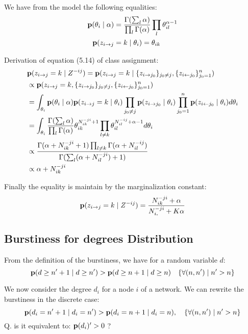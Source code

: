 \documentclass[a4paper, 12pt]{article}
\begin{document}
We have from the model the following equalities:
\begin{align}
\mathbf{p}(\theta_i \mid \alpha) &= \frac{\Gamma(\sum_l \alpha)}{\prod_l \Gamma(\alpha)} \prod_l \theta_{il}^{\alpha-1} \\
\mathbf{p}(z_{i\rightarrow j} &= k \mid \theta_i) = \theta_{ik}
\end{align}

Derivation of equation (5.14) of class assignment:
\begin{align}
&\mathbf{p}(z_{i\rightarrow j}=k \mid Z^{-ij}) = \mathbf{p}(z_{i\rightarrow j}=k \mid \{z_{i\rightarrow j_0}\}_{j_0\neq j},\{z_{i\leftarrow j_0}\}_{j_0= 1}^n )\\
&\propto \mathbf{p}(z_{i\rightarrow j}= k,\{z_{i\rightarrow j_0}\}_{j_0\neq j},\{z_{i\leftarrow j_0}\}_{j_0= 1}^n ) \\
&= \int_{\theta_i} \mathbf{p}(\theta_i \mid \alpha) \mathbf{p}(z_{i\rightarrow j}=k \mid \theta_i) \prod_{j_0\neq j} \mathbf{p}(z_{i\rightarrow j_0} \mid \theta_i) \prod_{j_0 =  1}^n  \mathbf{p}(z_{i\leftarrow j_0} \mid \theta_i)  d\theta_i \\
&=\int_{\theta_i} \frac{\Gamma(\sum_l \alpha)}{\prod_l \Gamma(\alpha)}\theta_{ik}^{N_{ik}^{-ji}+1} \prod_{l\neq k} \theta_{il}^{N_{il}^{-ij} +\alpha-1} d\theta_i \\
&\propto \frac{\Gamma(\alpha + N_{ik}^{-ji}+1)\prod_{l\neq k} \Gamma(\alpha + N_{il}^{-ij})}{\Gamma(\sum_l( \alpha + N_{il}^{-ji}) +1)} \\
&\propto \alpha + N_{ik}^{-ji}
\end{align}

Finally the equality is maintain by the marginalization constant:
\begin{equation}
\mathbf{p}(z_{i\rightarrow j}=k \mid Z^{-ij}) =\frac{ N_{ik}^{-ji} + \alpha}{ N_{i\bm{.}}^{-ji} + K\alpha }
\end{equation}

\subsection{Burstiness for degrees Distribution}
\label{burst_proof}

From the definition of the burstiness, we have for a random variable $d$:
\begin{equation}
	\mathbf{p}(d \geq n'+1 \mid d \geq n') > \mathbf{p}(d \geq n+1 \mid d \geq n) \quad \{\forall (n,n') \mid  n' > n \}
\end{equation}

We now consider the degree $d_i$ for a node $i$ of a network. We can rewrite the burstiness in the discrete case:
\begin{equation}
\mathbf{p}(d_i = n'+1 \mid d_i = n') > \mathbf{p}(d_i = n+1 \mid d_i = n), \quad \{\forall (n,n') \mid  n' > n \}
\end{equation}
\hspace{0.35\textwidth} Q. is it equivalent to: $\mathbf{p}(d_i)' > 0$ ?\\
\end{document}
